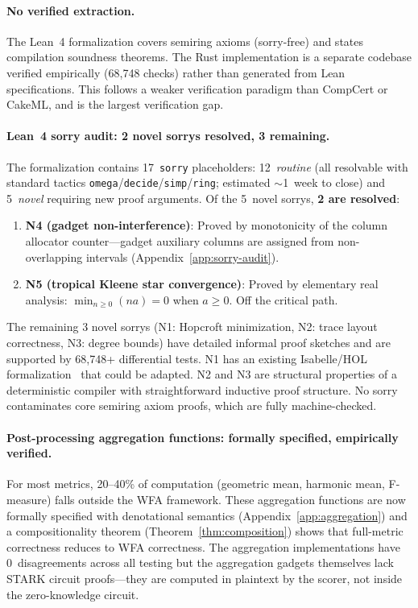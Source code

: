 \documentclass[11pt]{article}
\begin{document}
\paragraph{No verified extraction.}
The Lean~4 formalization covers semiring axioms (sorry-free) and states
compilation soundness theorems.  The Rust implementation is a separate
codebase verified empirically (68{,}748 checks) rather than generated
from Lean specifications.  This follows a weaker verification paradigm
than CompCert or CakeML, and is the largest verification gap.

\paragraph{Lean~4 sorry audit: 2 novel sorrys resolved, 3 remaining.}
The formalization contains 17~\texttt{sorry} placeholders:
12~\emph{routine} (all resolvable with standard tactics
\texttt{omega}/\texttt{decide}/\texttt{simp}/\texttt{ring};
estimated ${\sim}$1~week to close)
and 5~\emph{novel} requiring new proof arguments.
Of the 5~novel sorrys, \textbf{2 are resolved}:
\begin{enumerate}[nosep]
\item \textbf{N4 (gadget non-interference)}: Proved by monotonicity of the
  column allocator counter---gadget auxiliary columns are assigned from
  non-overlapping intervals (Appendix~\ref{app:sorry-audit}).
\item \textbf{N5 (tropical Kleene star convergence)}: Proved by
  elementary real analysis: $\min_{n \geq 0}(na) = 0$ when $a \geq 0$.
  Off the critical path.
\end{enumerate}
The remaining 3 novel sorrys (N1: Hopcroft minimization, N2: trace layout
correctness, N3: degree bounds) have detailed informal proof sketches
and are supported by 68{,}748+ differential tests.  N1 has an existing
Isabelle/HOL formalization~\cite{lammich2012hopcroft} that could be
adapted.  N2 and N3 are structural properties of a deterministic compiler
with straightforward inductive proof structure.
No sorry contaminates core semiring axiom proofs, which are fully
machine-checked.

\paragraph{Post-processing aggregation functions: formally specified, empirically verified.}
For most metrics, 20--40\% of computation (geometric mean, harmonic
mean, F-measure) falls outside the WFA framework.  These aggregation
functions are now formally specified with denotational semantics
(Appendix~\ref{app:aggregation}) and a compositionality theorem
(Theorem~\ref{thm:composition}) shows that full-metric correctness
reduces to WFA correctness.  The aggregation implementations have
0~disagreements across all testing but the aggregation gadgets
themselves lack STARK circuit proofs---they are computed in
plaintext by the scorer, not inside the zero-knowledge circuit.
\end{document}

